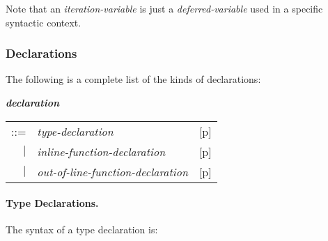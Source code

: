 \documentclass[12pt]{article}
\newcommand{\subsubsubsection}[1]{\paragraph[#1]{#1.}}
\newcommand{\emkey}[1]{{\em \bfseries #1}}
\newcommand{\pagref}[1]{p\pageref{#1}}
\newenvironment{indpar}[1][0.3in]%
	{\begin{list}{}%
		     {\setlength{\itemsep}{0in}%
		      \setlength{\topsep}{0in}%
		      \setlength{\parsep}{1ex}%
		      \setlength{\labelwidth}{#1}%
		      \setlength{\leftmargin}{#1}%
		      \addtolength{\leftmargin}{\labelsep}}%
	 \item}%
	{\end{list}}
\begin{document}
Note that an {\em iteration-variable} is just a
{\em deferred-variable} used in a specific syntactic
context.

\subsubsection{Declarations}
\label{DECLARATIONS}

The following is a complete list of the kinds of declarations:
\begin{indpar}
\emkey{declaration}\label{DECLARATION}
    \begin{tabular}[t]{@{}rll}
    ::= & {\em type-declaration}
        & [\pagref{TYPE-DECLARATIONS}] \\
    $|$ & {\em inline-function-declaration}
        & [\pagref{INLINE-FUNCTION-DECLARATIONS}] \\
    $|$ & {\em out-of-line-function-declaration}
        & [\pagref{OUT-OF-LINE-FUNCTION-DECLARATIONS}] \\
    \end{tabular}
\end{indpar}

\subsubsubsection{Type Declarations}
\label{TYPE-DECLARATIONS}

The syntax of a type declaration is:
\end{document}
